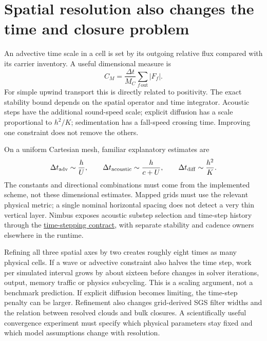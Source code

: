 \section{Spatial resolution also changes the time and closure problem}

An advective time scale in a cell is set by its outgoing relative flux compared
with its carrier inventory. A useful dimensional measure is
\[
 C_M=\frac{\Delta t}{M_C}\sum_{f\,\mathrm{out}}|F_f|.
\]
For simple upwind transport this is directly related to positivity. The exact
stability bound depends on the spatial operator and time integrator. Acoustic
steps have the additional sound-speed scale; explicit diffusion has a scale
proportional to $h^2/K$; sedimentation has a fall-speed crossing time. Improving
one constraint does not remove the others.

On a uniform Cartesian mesh, familiar explanatory estimates are
\[
 \Delta t_{\rm adv}\sim\frac{h}{U},\qquad
 \Delta t_{\rm acoustic}\sim\frac{h}{c+U},\qquad
 \Delta t_{\rm diff}\sim\frac{h^2}{K}.
\]
The constants and directional combinations must come from the implemented
scheme, not these dimensional estimates. Mapped grids must use the relevant
physical metric; a single nominal horizontal spacing does not detect a very
thin vertical layer. Nimbus exposes acoustic substep selection and time-step
history through the \href{../include/numerics/time_stepping/time_stepping_base.hpp}{time-stepping
contract}, with separate stability and cadence owners elsewhere in the runtime.

Refining all three spatial axes by two creates roughly eight times as many
physical cells. If a wave or advective constraint also halves the time step,
work per simulated interval grows by about sixteen before changes in solver
iterations, output, memory traffic or physics subcycling. This is a scaling
argument, not a benchmark prediction. If explicit diffusion becomes limiting,
the time-step penalty can be larger. Refinement also changes grid-derived SGS
filter widths and the relation between resolved clouds and bulk closures.
A scientifically useful convergence experiment must specify which physical
parameters stay fixed and which model assumptions change with resolution.
